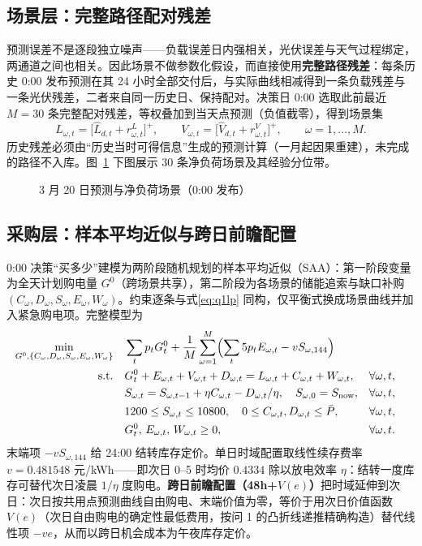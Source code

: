 \subsection{场景层：完整路径配对残差}\label{sec:q2scen}
预测误差不是逐段独立噪声——负载误差日内强相关，光伏误差与天气过程绑定，两通道之间也相关。因此场景不做参数化假设，而直接使用\textbf{完整路径残差}：每条历史 0:00 发布预测在其 24 小时全部交付后，与实际曲线相减得到一条负载残差与一条光伏残差，二者来自同一历史日、保持配对。决策日 0:00 选取此前最近 $M=30$ 条完整配对残差，等权叠加到当天点预测（负值截零），得到场景集
\begin{equation}
L_{\omega,t}=\bigl[\hat L_{d,t}+r^{L}_{\omega,t}\bigr]^+,\qquad
V_{\omega,t}=\bigl[\hat V_{d,t}+r^{V}_{\omega,t}\bigr]^+,\qquad \omega=1,\dots,M.
\label{eq:q2scenario}
\end{equation}
历史残差必须由“历史当时可得信息”生成的预测计算（一月起因果重建），未完成的路径不入库。图~\ref{fig:fig_f04_load_forecast} 下图展示 30 条净负荷场景及其经验分位带。

\begin{figure}[!htbp]\centering
{}
\caption{3 月 20 日预测与净负荷场景（0:00 发布）}\label{fig:fig_f04_load_forecast}
\end{figure}

\subsection{采购层：样本平均近似与跨日前瞻配置}\label{sec:q2saa}
0:00 决策“买多少”建模为两阶段随机规划\cite{saa-book,birge}的样本平均近似（SAA）\cite{kleywegt}：第一阶段变量为全天计划购电量 $G^0$（跨场景共享），第二阶段为各场景的储能追索与缺口补购 $(C_\omega,D_\omega,S_\omega,E_\omega,W_\omega)$。约束逐条与式\eqref{eq:q1lp} 同构，仅平衡式换成场景曲线并加入紧急购电项。完整模型为
\begin{equation}
\begin{aligned}
\min_{G^0,\{C_\omega,D_\omega,S_\omega,E_\omega,W_\omega\}}\quad
& \sum_{t}p_tG^0_t+\frac1M\sum_{\omega=1}^{M}\Bigl(\sum_{t}5p_tE_{\omega,t}-vS_{\omega,144}\Bigr)\\
\mathrm{s.t.}\quad
& G^0_t+E_{\omega,t}+V_{\omega,t}+D_{\omega,t}=L_{\omega,t}+C_{\omega,t}+W_{\omega,t}, && \forall\omega,t,\\
& S_{\omega,t}=S_{\omega,t-1}+\eta C_{\omega,t}-D_{\omega,t}/\eta,\quad S_{\omega,0}=S_{\mathrm{now}}, && \forall\omega,t,\\
& 1200\le S_{\omega,t}\le10800,\quad 0\le C_{\omega,t},D_{\omega,t}\le\bar P, && \forall\omega,t,\\
& G^0_t,\,E_{\omega,t},\,W_{\omega,t}\ge0, && \forall\omega,t.
\end{aligned}
\label{eq:q2saa}
\end{equation}
末端项 $-vS_{\omega,144}$ 给 24:00 结转库存定价。单日时域配置取线性续存费率 $v=0.481548$ 元/kWh——即次日 0--5 时均价 $0.4334$ 除以放电效率 $\eta$：结转一度库存可替代次日凌晨 $1/\eta$ 度购电。\textbf{跨日前瞻配置（48h+$V(e)$）}把时域延伸到次日：次日按共用点预测曲线自由购电、末端价值为零，等价于用次日价值函数 $V(e)$（次日自由购电的确定性最低费用，按问 1 的凸折线递推精确构造）替代线性项 $-ve$，从而以跨日机会成本为午夜库存定价。

